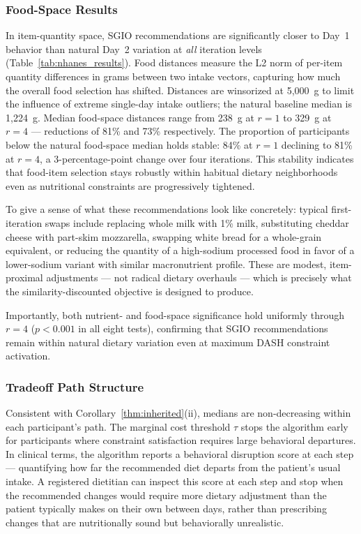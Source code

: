 \documentclass[journal]{IEEEtran}
\begin{document}
\subsubsection{Food-Space Results}

In item-quantity space, SGIO recommendations are significantly closer
to Day~1 behavior than natural Day~2 variation at \emph{all} iteration
levels (Table~\ref{tab:nhanes_results}). Food distances measure the
L2 norm of per-item quantity differences in grams between two intake
vectors, capturing how much the overall food selection has shifted.
Distances are winsorized at 5,000~g to limit the influence of extreme
single-day intake outliers; the natural baseline median is 1,224~g.
Median food-space distances range from 238~g at $r{=}1$ to 329~g at
$r{=}4$ --- reductions of 81\% and 73\% respectively. The proportion of
participants below the natural food-space median holds stable: 84\% at
$r{=}1$ declining to 81\% at $r{=}4$, a 3-percentage-point change over
four iterations. This stability indicates that food-item selection stays
robustly within habitual dietary neighborhoods even as nutritional
constraints are progressively tightened.

To give a sense of what these recommendations look like concretely:
typical first-iteration swaps include replacing whole milk with 1\%
milk, substituting cheddar cheese with part-skim mozzarella, swapping
white bread for a whole-grain equivalent, or reducing the quantity of a
high-sodium processed food in favor of a lower-sodium variant with
similar macronutrient profile. These are modest, item-proximal
adjustments --- not radical dietary overhauls --- which is precisely
what the similarity-discounted objective is designed to produce.

Importantly, both nutrient- and food-space significance hold uniformly
through $r{=}4$ ($p{<}0.001$ in all eight tests), confirming that
SGIO recommendations remain within natural dietary variation even at
maximum DASH constraint activation.

\subsubsection{Tradeoff Path Structure}

Consistent with Corollary~\ref{thm:inherited}(ii), medians are
non-decreasing within each participant's path. The marginal cost
threshold $\tau$ stops the algorithm early for participants where
constraint satisfaction requires large behavioral departures. In
clinical terms, the algorithm reports a behavioral disruption score
at each step --- quantifying how far the recommended diet departs from
the patient's usual intake. A registered dietitian can inspect this
score at each step and stop when the recommended changes would require
more dietary adjustment than the patient typically makes on their own
between days, rather than prescribing changes that are nutritionally
sound but behaviorally unrealistic.
\end{document}
